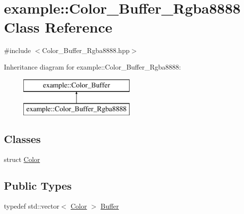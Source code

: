 \hypertarget{classexample_1_1_color___buffer___rgba8888}{}\section{example\+::Color\+\_\+\+Buffer\+\_\+\+Rgba8888 Class Reference}
\label{classexample_1_1_color___buffer___rgba8888}


{\ttfamily \#include $<$Color\+\_\+\+Buffer\+\_\+\+Rgba8888.\+hpp$>$}

Inheritance diagram for example\+::Color\+\_\+\+Buffer\+\_\+\+Rgba8888\+:\begin{figure}[H]
\begin{center}
\leavevmode
\includegraphics[height=2.000000cm]{classexample_1_1_color___buffer___rgba8888}
\end{center}
\end{figure}
\subsection*{Classes}
\begin{DoxyCompactItemize}
\item 
struct \mbox{\hyperlink{structexample_1_1_color___buffer___rgba8888_1_1_color}{Color}}
\end{DoxyCompactItemize}
\subsection*{Public Types}
\begin{DoxyCompactItemize}
\item 
typedef std\+::vector$<$ \mbox{\hyperlink{structexample_1_1_color___buffer___rgba8888_1_1_color}{Color}} $>$ \mbox{\hyperlink{classexample_1_1_color___buffer___rgba8888_ac6bfcddbbeeb02961b8724d9f5e10033}{Buffer}}
\end{DoxyCompactItemize}

